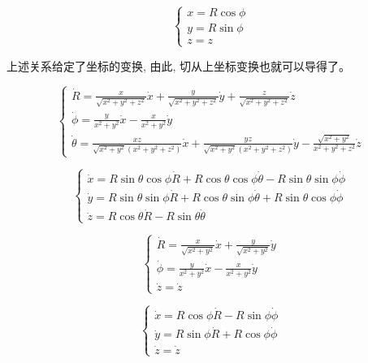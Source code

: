 \documentclass{ctexart}
\numberwithin{equation}{subsection}
\numberwithin{theorem}{subsection}
\numberwithin{definition}{subsection}
\numberwithin{proof}{subsection}
\numberwithin{lemma}{subsection}
\numberwithin{example}{subsection}
\numberwithin{remark}{subsection}
\numberwithin{corollary}{subsection}
\numberwithin{exercise}{subsection}
\numberwithin{problem}{subsection}
\numberwithin{question}{section}
\numberwithin{method}{subsection}
\begin{document}
    \begin{equation}
        \begin{cases}
            x = R\cos{\phi} \\
            y = R\sin{\phi} \\
            z = z
        \end{cases}
    \end{equation}
    

    上述关系给定了坐标的变换, 由此, 切从上坐标变换也就可以导得了。

    \begin{equation}
        \begin{cases}
            \dot{R} = \frac{x}{\sqrt{x^2 + y^2 + z^2}} \dot{x} + \frac{y}{\sqrt{x^2 + y^2 + z^2}}\dot{y} + \frac{z}{\sqrt{x^2 + y^2 + z^2}}\dot{z} \\
            \dot{\phi} = \frac{y}{x^2 + y^2}\dot{x} - \frac{x}{x^2 + y^2}\dot{y} \\
            \dot{\theta} = \frac{xz}{\sqrt{x^2 + y^2}(x^2+y^2+z^2)}\dot{x} + \frac{yz}{\sqrt{x^2 + y^2}(x^2+y^2+z^2)}\dot{y} - \frac{\sqrt{x^2 + y^2}}{x^2+y^2+z^2}\dot{z}
        \end{cases}
    \end{equation}
        
    \begin{equation}
        \begin{cases}
            \dot{x} = R\sin{\theta}\cos{\phi}\dot{R} + R\cos{\theta}\cos{\phi}\dot{\theta} - R\sin{\theta}\sin{\phi}\dot{\phi} \\
            \dot{y} = R\sin{\theta}\sin{\phi}\dot{R} + R\cos{\theta}\sin{\phi}\dot{\theta} + R\sin{\theta}\cos{\phi}\dot{\phi} \\
            \dot{z} = R\cos{\theta}\dot{R} - R\sin{\theta}\dot{\theta}
        \end{cases}
    \end{equation}

    \begin{equation}
        \begin{cases}
            \dot{R} = \frac{x}{\sqrt{x^2 + y^2}}\dot{x} + \frac{y}{\sqrt{x^2 + y^2}}\dot{y} \\
            \dot{\phi} = \frac{y}{x^2 + y^2}\dot{x} - \frac{x}{x^2 + y^2}\dot{y} \\
            \dot{z} = \dot{z}
        \end{cases}
    \end{equation}

    \begin{equation}
        \begin{cases}
            \dot{x} = R\cos{\phi}\dot{R} - R\sin{\phi}\dot{\phi} \\
            \dot{y} = R\sin{\phi}\dot{R} + R\cos{\phi}\dot{\phi} \\
            \dot{z} = \dot{z}
        \end{cases}
    \end{equation}
    
\end{document}
